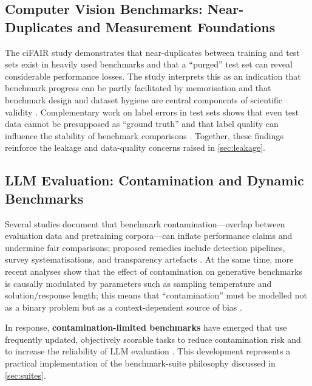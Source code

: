 \documentclass[12pt, a4paper]{article}
\begin{document}
\subsection{Computer Vision Benchmarks: Near-Duplicates and Measurement
            Foundations}
\label{sec:case_cv}

The ciFAIR study demonstrates that near-duplicates between training and
test sets exist in heavily used benchmarks and that a ``purged'' test set
can reveal considerable performance losses.  The study interprets this
as an indication that benchmark progress can be partly facilitated by
memorisation and that benchmark design and dataset hygiene are central
components of scientific validity \cite{Barz2020}.  Complementary work
on label errors in test sets shows that even test data cannot be
presupposed as ``ground truth'' and that label quality can influence the
stability of benchmark comparisons \cite{Northcutt2021}.  Together,
these findings reinforce the leakage and data-quality concerns raised in
\cref{sec:leakage}.

\subsection{LLM Evaluation: Contamination and Dynamic Benchmarks}
\label{sec:case_llm}

Several studies document that benchmark contamination---overlap between
evaluation data and pretraining corpora---can inflate performance
claims and undermine fair comparisons; proposed remedies include
detection pipelines, survey systematisations, and transparency artefacts
\cite{XuR2024,XuC2024}.  At the same time, more recent analyses show
that the effect of contamination on generative benchmarks is causally
modulated by parameters such as sampling temperature and
solution/response length; this means that ``contamination'' must be
modelled not as a binary problem but as a context-dependent source of
bias \cite{Schaeffer2025}.

In response, \textbf{contamination-limited benchmarks} have emerged
that use frequently updated, objectively scorable tasks to reduce
contamination risk and to increase the reliability of LLM evaluation
\cite{LiveBench2024}.  This development represents a practical
implementation of the benchmark-suite philosophy discussed in
\cref{sec:suites}.
\end{document}
